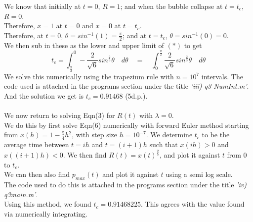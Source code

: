 \documentclass[10pt]{article}
\begin{document}
We know that initially at $t=0$, $R=1$; and when the bubble collapse at $t=t_c$, $R=0$.\\
Therefore, $x=1$ at $t=0$ and $x=0$ at $t=t_c$.\\
Therefore, at $t=0$, $\theta = sin^{-1}(1)=\frac{\pi}{2}$; and at $t=t_c$, $\theta=sin^{-1}(0)=0$.\\
We then sub in these as the lower and upper limit of $(*)$ to get
\[t_c = \int_{\frac{\pi}{2}}^0 -\frac{2}{\sqrt{6}}sin^{\frac{2}{3}}\theta \quad d\theta \quad = \quad \int^{\frac{\pi}{2}}_0 \frac{2}{\sqrt{6}}sin^{\frac{2}{3}}\theta \quad d\theta\]
We solve this numerically using the trapezium rule with $n=10^7$ intervals. The code used is attached in the programs section under the title \emph{'iii) q3 \textunderscore NumInt.m'}.\\
And the solution we get is \underline{$t_c = 0.91468$} (5d.p.).\\\\
We now return to solving Eqn(3) for $R(t)$ with $\lambda=0$.\\
We do this by first solve Eqn(6) numerically with forward Euler method starting from $x(h)=1-\frac{5}{4}h^2$, with step size $h=10^{-7}$. We determine $t_c$ to be the average time between $t=ih$ and $t=(i+1)h$ such that $x(ih)>0$ and $x((i+1)h)<0$. We then find $R(t)=x(t)^{\frac{2}{5}}$, and plot it against $t$ from $0$ to $t_c$.\\
We can then also find $p_{max}(t)$ and plot it against $t$ using a semi log scale.\\
The code used to do this is attached in the programs section under the title \emph{'iv) q3\textunderscore main.m'}.\\
Using this method, we found $t_c=0.91468225$. This agrees with the value found via numerically integrating.
\end{document}
